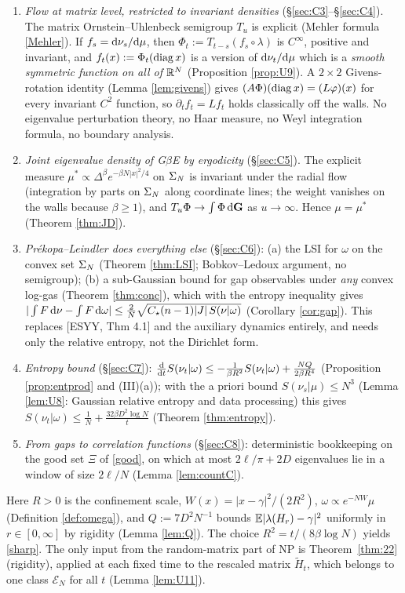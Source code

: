 \begin{enumerate}[leftmargin=1.8em,itemsep=2pt,label=(\Roman*)]
\item \emph{Flow at matrix level, restricted to invariant densities} (\S\ref{sec:C3}--\S\ref{sec:C4}). The matrix Ornstein--Uhlenbeck semigroup $T_u$ is explicit (Mehler formula \eqref{Mehler}). If $f_s=\mathrm{d}\nu_s/\mathrm{d}\mu$, then $\Phi_t:=T_{t-s}(f_s\circ\lambda)$ is $C^\infty$, positive and invariant, and $f_t(x):=\Phi_t(\operatorname{diag} x)$ is a version of $\mathrm{d}\nu_t/\mathrm{d}\mu$ which is a \emph{smooth symmetric function on all of $\mathbb{R}^N$} (Proposition \ref{prop:U9}).
A $2\times2$ Givens-rotation identity (Lemma \ref{lem:givens}) gives $(A\Phi)(\operatorname{diag} x)=(L\varphi)(x)$ for every invariant $C^2$ function, so $\partial_tf_t=Lf_t$ holds classically off the walls. No eigenvalue perturbation theory, no Haar measure, no Weyl integration formula, no boundary analysis.
\item \emph{Joint eigenvalue density of G$\beta$E by ergodicity} (\S\ref{sec:C5}). The explicit measure $\mu^*\propto\Delta^\beta e^{-\beta N|x|^2/4}$ on $\Sigma_N$ is invariant under the radial flow (integration by parts on $\Sigma_N$ along coordinate lines; the weight vanishes on the walls because $\beta\ge1$), and $T_u\Phi\to\int\Phi\,\mathrm{d}\mathbf{G}$ as $u\to\infty$. Hence $\mu=\mu^*$ (Theorem \ref{thm:JD}).
\item \emph{Pr\'ekopa--Leindler does everything else} (\S\ref{sec:C6}): (a) the LSI for $\omega$ on the convex set $\Sigma_N$ (Theorem \ref{thm:LSI}; Bobkov--Ledoux argument, no semigroup); (b) a sub-Gaussian bound for gap observables under \emph{any} convex log-gas (Theorem \ref{thm:conc}), which with the entropy inequality gives
$|\int F\,\mathrm{d}\nu-\int F\,\mathrm{d}\omega|\le\frac2N\sqrt{C_\star(n-1)|J|\,S(\nu|\omega)}$ (Corollary \ref{cor:gap}). This replaces [ESYY, Thm 4.1] and the auxiliary dynamics entirely, and needs only the relative entropy, not the Dirichlet form.
\item \emph{Entropy bound} (\S\ref{sec:C7}): $\frac{\mathrm{d}}{\mathrm{d} t}S(\nu_t|\omega)\le-\frac{1}{\beta R^2}S(\nu_t|\omega)+\frac{NQ}{2\beta R^4}$ (Proposition \ref{prop:entprod} and (III)(a)); with the a priori bound $S(\nu_s|\mu)\le N^3$ (Lemma \ref{lem:U8}: Gaussian relative entropy and data processing) this gives $S(\nu_t|\omega)\le\frac1N+\frac{32\beta D^2\log N}{t}$ (Theorem \ref{thm:entropy}).
\item \emph{From gaps to correlation functions} (\S\ref{sec:C8}): deterministic bookkeeping on the good set $\Xi$ of \eqref{good}, on which at most $2\ell/\pi+2D$ eigenvalues lie in a window of size $2\ell/N$ (Lemma \ref{lem:countC}).
\end{enumerate}
Here $R>0$ is the confinement scale, $W(x)=|x-\gamma|^2/(2R^2)$, $\omega\propto e^{-NW}\mu$ (Definition \ref{def:omega}), and $Q:=7D^2N^{-1}$ bounds $\mathbb{E}|\lambda(H_r)-\gamma|^2$ uniformly in $r\in[0,\infty]$ by rigidity (Lemma \ref{lem:Q}). The choice $R^2=t/(8\beta\log N)$ yields \eqref{sharp}.
The only input from the random-matrix part of NP is Theorem~\ref{thm:22} (rigidity), applied at each fixed time to the rescaled matrix $\widetilde H_t$, which belongs to one class $\mathcal E_N$ for all $t$ (Lemma \ref{lem:U11}).
